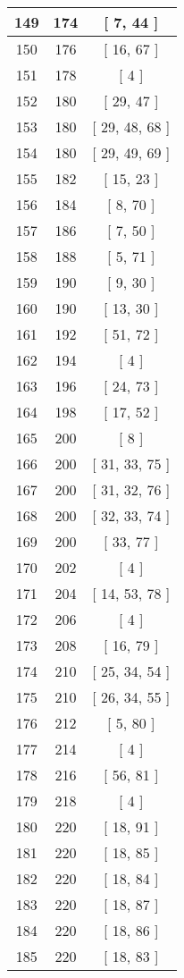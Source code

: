 \begin{center}
\begin{longtable}[H]{|| c c c ||}
149 & 174 & [ 7, 44 ]
\\\hline
150 & 176 & [ 16, 67 ]
\\\hline
151 & 178 & [ 4 ]
\\\hline
152 & 180 & [ 29, 47 ]
\\\hline
153 & 180 & [ 29, 48, 68 ]
\\\hline
154 & 180 & [ 29, 49, 69 ]
\\\hline
155 & 182 & [ 15, 23 ]
\\\hline
156 & 184 & [ 8, 70 ]
\\\hline
157 & 186 & [ 7, 50 ]
\\\hline
158 & 188 & [ 5, 71 ]
\\\hline
159 & 190 & [ 9, 30 ]
\\\hline
160 & 190 & [ 13, 30 ]
\\\hline
161 & 192 & [ 51, 72 ]
\\\hline
162 & 194 & [ 4 ]
\\\hline
163 & 196 & [ 24, 73 ]
\\\hline
164 & 198 & [ 17, 52 ]
\\\hline
165 & 200 & [ 8 ]
\\\hline
166 & 200 & [ 31, 33, 75 ]
\\\hline
167 & 200 & [ 31, 32, 76 ]
\\\hline
168 & 200 & [ 32, 33, 74 ]
\\\hline
169 & 200 & [ 33, 77 ]
\\\hline
170 & 202 & [ 4 ]
\\\hline
171 & 204 & [ 14, 53, 78 ]
\\\hline
172 & 206 & [ 4 ]
\\\hline
173 & 208 & [ 16, 79 ]
\\\hline
174 & 210 & [ 25, 34, 54 ]
\\\hline
175 & 210 & [ 26, 34, 55 ]
\\\hline
176 & 212 & [ 5, 80 ]
\\\hline
177 & 214 & [ 4 ]
\\\hline
178 & 216 & [ 56, 81 ]
\\\hline
179 & 218 & [ 4 ]
\\\hline
180 & 220 & [ 18, 91 ]
\\\hline
181 & 220 & [ 18, 85 ]
\\\hline
182 & 220 & [ 18, 84 ]
\\\hline
183 & 220 & [ 18, 87 ]
\\\hline
184 & 220 & [ 18, 86 ]
\\\hline
185 & 220 & [ 18, 83 ]

\end{longtable}
\end{center}
